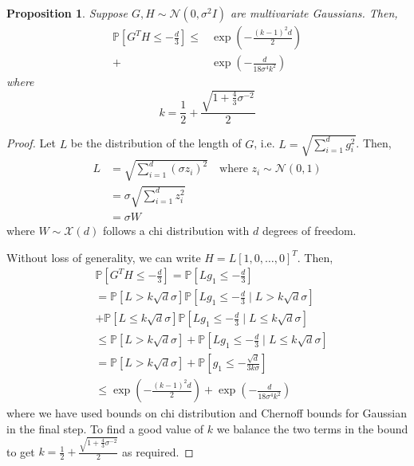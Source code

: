 \documentclass{article}
\theoremstyle{plain}
\newtheorem{proposition}[theorem]{Proposition}
\theoremstyle{definition}
\theoremstyle{remark}
\begin{document}
\begin{proposition}
    Suppose \( G,H\sim\mathcal{N}(0,\sigma^2I) \) are multivariate Gaussians. Then,
    \begin{align}
        \mathbb{P}\left[G^T H\leq-\frac{d}{3}\right] \leq &\exp\left(-\frac{(k-1)^2 d}{2}\right)\\ + &\exp\left(-\frac{d}{18\sigma^4 k^2}\right)
    \end{align}
    where 
    \begin{equation}
        k = \frac{1}{2} + \frac{\sqrt{1+\frac{4}{3}\sigma^{-2}}}{2}
    \end{equation}
\end{proposition}
\begin{proof}
    Let \( L \) be the distribution of the length of \( G \), i.e. \( L = \sqrt{\sum_{i=1}^{d} g_i^2}  \). Then,
    \begin{align}
        L &= \sqrt{\sum_{i=1}^{d}(\sigma z_i)^2} \quad \text{where } z_i\sim\mathcal{N}(0,1) \\
          &= \sigma\sqrt{\sum_{i=1}^{d}z_i^2} \\
          &= \sigma W
    \end{align}
    where \( W\sim\mathcal{X}(d) \) follows a chi distribution with \( d \) degrees of freedom.
    
    Without loss of generality, we can write \( H=L[1, 0, \ldots, 0]^T \). Then,
    \begin{align}
        &\mathbb{P}\left[G^T H\leq-\frac{d}{3}\right] = \mathbb{P}\left[Lg_1 \leq -\frac{d}{3}\right] \\
        &= \mathbb{P}\left[L>k\sqrt{d}\sigma\right]\mathbb{P}\left[Lg_1\leq -\frac{d}{3} \mid L > k\sqrt{d}\sigma \right]\\ &+ \mathbb{P}\left[L\leq k\sqrt{d}\sigma\right]\mathbb{P}\left[Lg_1 \leq -\frac{d}{3}\mid L\leq k\sqrt{d}\sigma \right] \\
        &\leq \mathbb{P}\left[L>k\sqrt{d}\sigma\right] + \mathbb{P}\left[Lg_1 \leq -\frac{d}{3}\mid L\leq k\sqrt{d}\sigma \right] \\
        &= \mathbb{P}\left[L>k\sqrt{d}\sigma\right] + \mathbb{P}\left[g_1 \leq -\frac{\sqrt{d} }{3k \sigma }\right] \\
        &\leq \exp\left(-\frac{(k-1)^2d}{2}\right) + \exp\left(-\frac{d}{18\sigma^4k^2}\right)
    \end{align}
    where we have used bounds on chi distribution  and Chernoff bounds for Gaussian in the final step.
    To find a good value of \( k \) we balance the two terms in the bound to get
      \(  k = \frac{1}{2} + \frac{\sqrt{1+\frac{4}{3}\sigma^{-2}}}{2} \) as required.
\end{proof}
\end{document}

